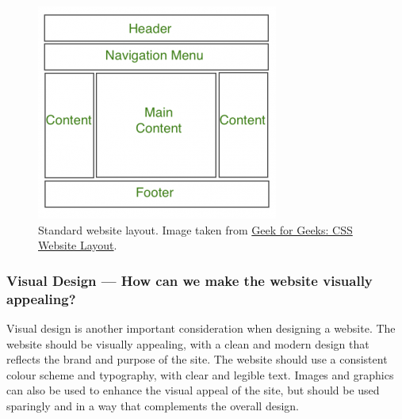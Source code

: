 \documentclass[../main.tex]{subfiles}
\begin{document}
                \begin{figure}[H]
                    \centering
                    \includegraphics[width=0.45\linewidth]{images/webLayout.png}
                        \caption{Standard website layout.
                            Image taken from \href{https://www.geeksforgeeks.org/css-website-layout/}{Geek
                                    for Geeks: CSS Website Layout}.
                        }
                        \label{fig:webLayout}
                \end{figure}

            \subsubsection{Visual Design — How can we make the website visually appealing?}
                Visual design is another important consideration when designing a website.
                The website should be visually appealing, with a clean and modern design that
                    reflects the brand and purpose of the site.
                The website should use a consistent colour scheme and typography, with clear
                    and legible text.
                Images and graphics can also be used to enhance the visual appeal of the site,
                    but should be used sparingly and in a way that complements the overall design.
\end{document}
